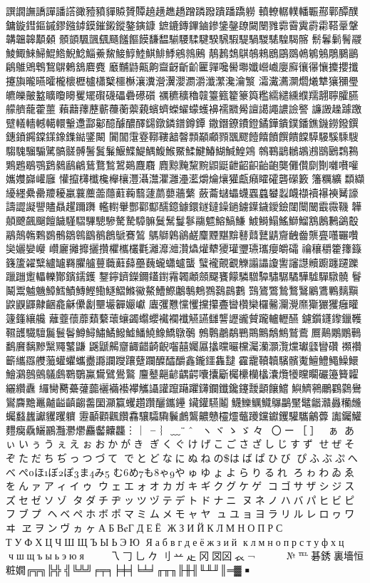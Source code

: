譔譋譕譑譂譒譗豃豷豶貚贆贇贉趬趪趭趫蹭蹸蹳蹪蹯蹻軂
轒轑轏轐轓辴酀鄿醰醭鏞鏇鏏鏂鏚鏐鏹鏬鏌鏙鎩鏦鏊鏔鏮
鏣鏕鏄鏎鏀鏒鎥鏧镽闚闛雡霩霫霬霨霦鞳鞷鞶韝韞韟顜顙
顝顗颿颽颻颾饈饇饃馦馧騚騕騥騝騤騛騢騠騧騣騞騜騔髂
鬋鬊鬎鬌鬷鯪鯫鯠鯞鯤鯦鯢鯰鯔鯗鯬鯜鯙鯥鯕鯡鯚鵷鶁鶊
鶄鶈鵱鶀鵸鶆鶋鶌鵽鵫鵴鵵鵰鵩鶅鵳鵻鶂鵯鵹鵿鶇鵨麔麑
黀黼鼭齀齁齍齖齗齘匷嚲嚵嚳壣孅巆巇廮廯忀忁懹攗攖攕
攓旟曨曣曤櫳櫰櫪櫨櫹櫱櫮櫯瀼瀵瀯瀷瀴瀱灂瀸瀿瀺瀹瀪
灀瀻瀳灁爓爔犨獽獼璺皫皪皾盭矌矎矏矍矲礥礣礧礨礤礩
禲穮穬穭竷籉籈籊籇籅糮繻繾纁纀羺翿聹臛臙艨艩蘢藿蘁
藾蘛蘀藶蘄蘉蘅蘌藽蠙蠐蠑蠗蠓蠖襣襦覹觷譠譪譝譨譣譥
譧譭趮躆躈躄轙轖轗轕轘轚邍酃酁醷醵醲醳鐋鐓鏻鐠鐏鐔
鏾鐕鐐鐨鐙鐍鏵鐀鏷鐇鐎鐖鐒鏺鐉鏸鐼鐊鏿鏼鐌鏶鐑鐆闞
闠闟霮霯鞹鞻韽韾顠顢顣顟飁飂饐饎饙饌饋饓騲騴騱騬騪
騶騩騮騸騭髇髊髆鬐鬒鬑鰋鰈鯷鰅鰒鯸鱀鰇鰎鰆鰗鰔鰉鶟
鶙鶤鶝鶒鶘鶐鶛鶠鶔鶜鶪鶗鶡鶚鶢鶨鶞鶣鶿鶩鶖鶦鶧麙麛
麚黥黤黧黦鼰鼮齛齠齞齝齙龑儺儹劘劗囃嚽嚾孈孇巋巏廱
懽攛欂櫼欃櫸欀灃灄灊灈灉灅灆爝爚爙獾甗癪矐礭礱礯籔
籓糲纊纇纈纋纆纍罍羻耰臝蘘蘪蘦蘟蘣蘜蘙蘧蘮蘡蘠蘩
蘞蘥蠩蠝蠛蠠蠤蠜蠫衊襭襩襮襫觺譹譸譅譺譻贐贔趯躎躌
轞轛轝酆酄酅醹鐿鐻鐶鐩鐽鐰鐹鐪鐷鐬鑀鐱闥闤闣霵霺鞿
韡顤飉飆飀饘饖騹騽驆驄驂驁騺騿髍鬕鬗鬘鬖鬺魒鰫鰝鰜
鰬鰣鰨鰩鰤鰡鶷鶶鶼鷁鷇鷊鷏鶾鷅鷃鶻鶵鷎鶹鶺鶬鷈鶱鶭
鷌鶳鷍鶲鹺麜黫黮黭鼛鼘鼚鼱齎齥齤龒亹囆囅囋奱孋孌巕
巑廲攡攠攦攢欋欈欉氍灕灖灗灒爞爟犩獿瓘瓕瓙瓗癭皭礵
禴穰穱籗籜籙籛籚糴糱纑罏羇臞艫蘴蘵蘳蘬蘲蘶蠬蠨蠦蠪
蠥襱覿覾觻譾讄讂讆讅譿贕躕躔躚躒躐躖躗轠轢酇鑌鑐鑊
鑋鑏鑇鑅鑈鑉鑆霿韣顪顩飋饔饛驎驓驔驌驏驈驊驉驒驐髐
鬙鬫鬻魖魕鱆鱈鰿鱄鰹鰳鱁鰼鰷鰴鰲鰽鰶鷛鷒鷞鷚鷋鷐鷜
鷑鷟鷩鷙鷘鷖鷵鷕鷝麶黰鼵鼳鼲齂齫龕龢儽劙壨壧奲孍巘
蠯彏戁戃戄攩攥斖曫欑欒欏毊灛灚爢玂玁玃癰矔籧籦纕艬
蘺虀蘹蘼蘱蘻蘾蠰蠲蠮蠳襶襴襳觾讌讎讋讈豅贙躘轤轣醼
鑢鑕鑝鑗鑞韄韅頀驖驙鬞鬟鬠鱒鱘鱐鱊鱍鱋鱕鱙鱌鱎鷻鷷
鷯鷣鷫鷸鷤鷶鷡鷮鷦鷲鷰鷢鷬鷴鷳鷨鷭黂黐黲黳鼆鼜鼸
鼷鼶齃齏齱齰齮齯囓囍孎屭攭曭曮欓灟灡灝灠爣瓛瓥矕礸
禷禶籪纗羉艭虃蠸蠷蠵衋讔讕躞躟躠躝醾醽釂鑫鑨鑩雥靆
靃靇韇韥驞髕魙鱣鱧鱦鱢鱞鱠鸂鷾鸇鸃鸆鸅鸀鸁鸉鷿鷽鸄
麠鼞齆齴齵齶囔攮斸欘欙欗欚灢爦犪矘矙礹籩籫糶纚纘纛
纙臠臡虆虇虈襹襺襼襻觿讘讙躥躤躣鑮鑭鑯鑱鑳靉顲饟鱨
鱮鱭鸋鸍鸐鸏鸒鸑麡黵鼉齇齸齻齺齹圞灦籯蠼趲躦釃鑴鑸
鑶鑵驠鬮鱴鱳鱱鱵鸔鸓黶鼊龤灨灥糷虪蠾蠽蠿讞貜躩軉
靋顳顴飌饡馫驤驦驧鬤鸕鸗齈戇欞爧虌躨钂钀钁驩驨鸙虋
讟钃鱹麷癵驫鱺鸝灩灪爩麤齾齉龘︙ ︳╴︴﹏¨̈ˆ
＾ヽヾゝゞ々〆〇ー［］✽ぁ
あぃいぅうぇえぉおかがき
ぎくぐけげこごさざしじすず
せぜそぞただちぢっつづて
でとどなにぬねのはばぱひび
ぴふぶぷへべぺほぼぽまみ
むめもゃやゅゆょよらりるれ
ろゎわゐゑをんァアィイゥ
ウェエォオカガキギクグケゲ
コゴサザシジスズセゼソゾ
タダチヂッツヅテデトドナニ
ヌネノハバパヒビピフブプ
ヘベペホボポマミムメモャヤ
ュユョヨラリルレロヮワヰ
ヱヲンヴヵヶАБВГДЕЁ
ЖЗИЙКЛМНОПРС
ТУФХЦЧШЩЪЫЬЭЮ
Яабвгдеёжзий
клмнопрстуфхц
чшщъыьэюя⇧↸↹
㇏乁𠃌乚𠂊刂䒑龰冈㘝龱𧘇¬￢
￤＇＂㈱№℡碁銹裏墻恒粧嫺╔╦╗╠╬
╣╚╩╝╒╤╕╞╪╡╘╧╛╓╥╖╟╫╢╙╨╜║═▓
￭


